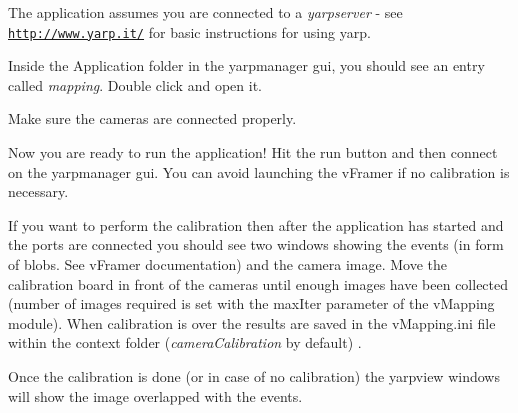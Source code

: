 \begin{DoxyItemize}
\item The application assumes you are connected to a {\itshape yarpserver} -\/ see \href{http://www.yarp.it/}{\tt http\+://www.\+yarp.\+it/} for basic instructions for using yarp.
\item Inside the Application folder in the yarpmanager gui, you should see an entry called {\itshape mapping}. Double click and open it.
\item Make sure the cameras are connected properly.
\item Now you are ready to run the application! Hit the run button and then connect on the yarpmanager gui. You can avoid launching the v\+Framer if no calibration is necessary.
\item If you want to perform the calibration then after the application has started and the ports are connected you should see two windows showing the events (in form of blobs. See v\+Framer documentation) and the camera image. Move the calibration board in front of the cameras until enough images have been collected (number of images required is set with the max\+Iter parameter of the v\+Mapping module). When calibration is over the results are saved in the v\+Mapping.\+ini file within the context folder ({\itshape camera\+Calibration} by default) .
\item Once the calibration is done (or in case of no calibration) the yarpview windows will show the image overlapped with the events. 
\end{DoxyItemize}